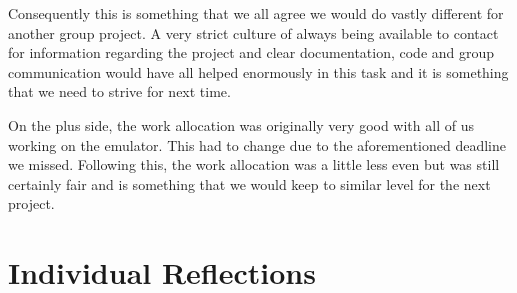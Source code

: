 \documentclass[a4paper,12pt]{article}
\begin{document}
Consequently this is something that we all agree we would do vastly different for another group project. A very strict culture of always being available to contact for information regarding the project and clear documentation, code and group communication would have all helped enormously in this task and it is something that we need to strive for next time.

On the plus side, the work allocation was originally very good with all of us working on the emulator. This had to change due to the aforementioned deadline we missed. Following this, the work allocation was a little less even but was still certainly fair and is something that we would keep to similar level for the next project.

\section{Individual Reflections}
\end{document}
